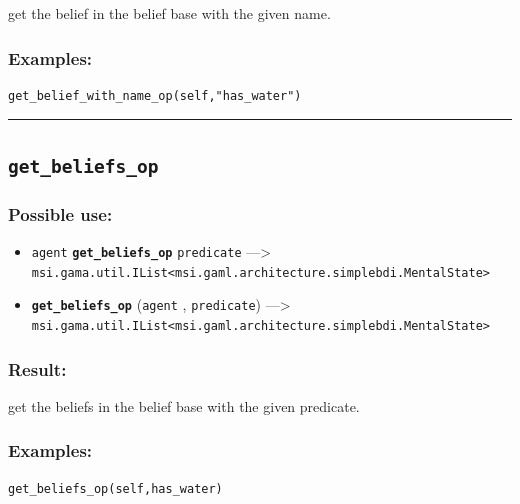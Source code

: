 \documentclass[]{book}
\providecommand{\tightlist}{%
  \setlength{\itemsep}{0pt}\setlength{\parskip}{0pt}}
\theoremstyle{definition}
\theoremstyle{definition}
\theoremstyle{definition}
\theoremstyle{remark}
\begin{document}
get the belief in the belief base with the given name.

\subsubsection{Examples:}\label{examples-145}

\begin{verbatim}
get_belief_with_name_op(self,"has_water") 
\end{verbatim}

\begin{center}\rule{0.5\linewidth}{\linethickness}\end{center}

\subsection{\texorpdfstring{\texttt{get\_beliefs\_op}}{get\_beliefs\_op}}\label{get_beliefs_op}

\subsubsection{Possible use:}\label{possible-use-199}

\begin{itemize}
\tightlist
\item
  \texttt{agent} \textbf{\texttt{get\_beliefs\_op}} \texttt{predicate}
  ---\textgreater{}
  \texttt{msi.gama.util.IList\textless{}msi.gaml.architecture.simplebdi.MentalState\textgreater{}}
\item
  \textbf{\texttt{get\_beliefs\_op}} (\texttt{agent} ,
  \texttt{predicate}) ---\textgreater{}
  \texttt{msi.gama.util.IList\textless{}msi.gaml.architecture.simplebdi.MentalState\textgreater{}}
\end{itemize}

\subsubsection{Result:}\label{result-193}

get the beliefs in the belief base with the given predicate.

\subsubsection{Examples:}\label{examples-146}

\begin{verbatim}
get_beliefs_op(self,has_water) 
\end{verbatim}
\end{document}

